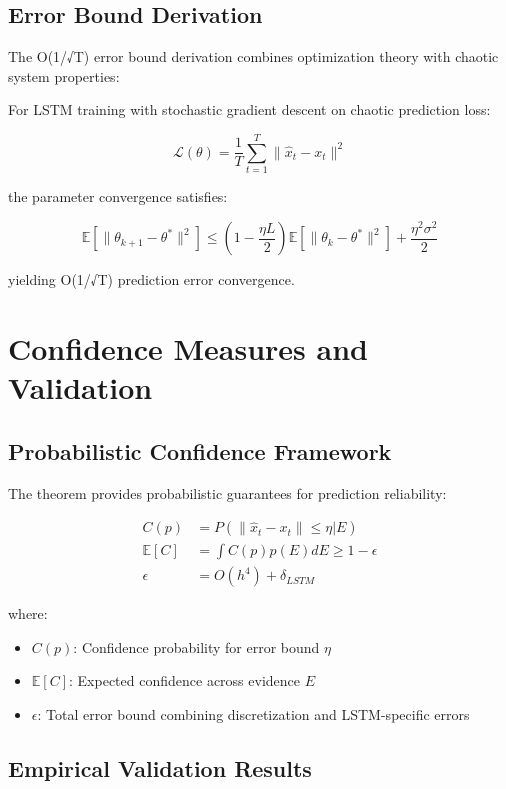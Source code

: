 \documentclass[11pt,a4paper]{article}
\begin{document}
\subsection{Error Bound Derivation}

The O(1/√T) error bound derivation combines optimization theory with chaotic system properties:

\begin{theorem}
For LSTM training with stochastic gradient descent on chaotic prediction loss:

\[
\mathcal{L}(\theta) = \frac{1}{T} \sum_{t=1}^T \| \hat{x}_t - x_t \|^2
\]

the parameter convergence satisfies:

\[
\mathbb{E}[\|\theta_{k+1} - \theta^*\|^2] \leq \left(1 - \frac{\eta L}{2}\right) \mathbb{E}[\|\theta_k - \theta^*\|^2] + \frac{\eta^2 \sigma^2}{2}
\]

yielding O(1/√T) prediction error convergence.
\end{theorem}

\section{Confidence Measures and Validation}

\subsection{Probabilistic Confidence Framework}

The theorem provides probabilistic guarantees for prediction reliability:

\begin{align}
C(p) &= P(\|\hat{x}_t - x_t\| \leq \eta | E) \\
\mathbb{E}[C] &= \int C(p) p(E) dE \geq 1 - \epsilon \\
\epsilon &= O(h^4) + \delta_{LSTM}
\end{align}

where:
\begin{itemize}
\item \(C(p)\): Confidence probability for error bound \(\eta\)
\item \(\mathbb{E}[C]\): Expected confidence across evidence \(E\)
\item \(\epsilon\): Total error bound combining discretization and LSTM-specific errors
\end{itemize}

\subsection{Empirical Validation Results}
\end{document}
